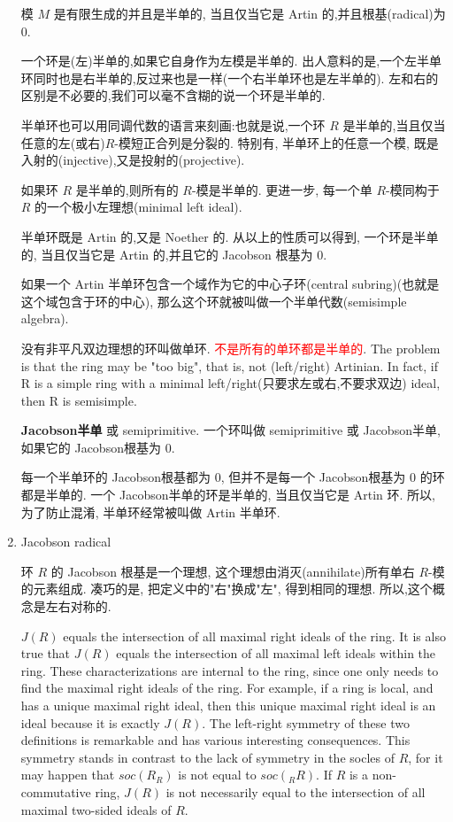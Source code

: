 \documentclass{ctexart}
\begin{document}
\begin{enumerate}
模 $M$ 是有限生成的并且是半单的, 当且仅当它是 Artin 的,并且根基(radical)为 $0$.

一个环是(左)半单的,如果它自身作为左模是半单的. 出人意料的是,一个左半单环同时也是右半单的,反过来也是一样(一个右半单环也是左半单的). 左和右的区别是不必要的,我们可以毫不含糊的说一个环是半单的.

半单环也可以用同调代数的语言来刻画:也就是说,一个环 $R$ 是半单的,当且仅当任意的左(或右)$R$-模短正合列是分裂的. 特别有, 半单环上的任意一个模, 既是入射的(injective),又是投射的(projective).

如果环 $R$ 是半单的,则所有的 $R$-模是半单的. 更进一步, 每一个单 $R$-模同构于 $R$ 的一个极小左理想(minimal left ideal).

半单环既是 Artin 的,又是 Noether 的. 从以上的性质可以得到, 一个环是半单的, 当且仅当它是 Artin 的,并且它的 Jacobson 根基为 $0$.

如果一个 Artin 半单环包含一个域作为它的中心子环(central subring)(也就是这个域包含于环的中心), 那么这个环就被叫做一个半单代数(semisimple algebra).

没有非平凡双边理想的环叫做单环. \textcolor{red}{不是所有的单环都是半单的}. The problem is that the ring may be "too big", that is, not (left/right) Artinian. In fact, if R is a simple ring with a minimal left/right(只要求左或右,不要求双边) ideal, then R is semisimple.

\textbf{Jacobson半单} 或 semiprimitive. 一个环叫做 semiprimitive 或 Jacobson半单, 如果它的 Jacobson根基为 $0$.

每一个半单环的 Jacobson根基都为 $0$, 但并不是每一个 Jacobson根基为 $0$ 的环都是半单的. 一个 Jacobson半单的环是半单的, 当且仅当它是 Artin 环. 所以, 为了防止混淆, 半单环经常被叫做 Artin 半单环.

\item Jacobson radical\cite{jacobson_radical}

环 $R$ 的 Jacobson 根基是一个理想, 这个理想由消灭(annihilate)所有单右 $R$-模的元素组成. 凑巧的是, 把定义中的"右"换成"左", 得到相同的理想. 所以,这个概念是左右对称的.

$J(R)$ equals the intersection of all maximal right ideals of the ring. It is also true that $J(R)$ equals the intersection of all maximal left ideals within the ring. These characterizations are internal to the ring, since one only needs to find the maximal right ideals of the ring. For example, if a ring is local, and has a unique maximal right ideal, then this unique maximal right ideal is an ideal because it is exactly $J(R)$. The left-right symmetry of these two definitions is remarkable and has various interesting consequences. This symmetry stands in contrast to the lack of symmetry in the socles of $R$, for it may happen that $soc(R_R)$ is not equal to $soc(_RR)$. If $R$ is a non-commutative ring, $J(R)$ is not necessarily equal to the intersection of all maximal two-sided ideals of $R$.


\end{enumerate}
\end{document}
